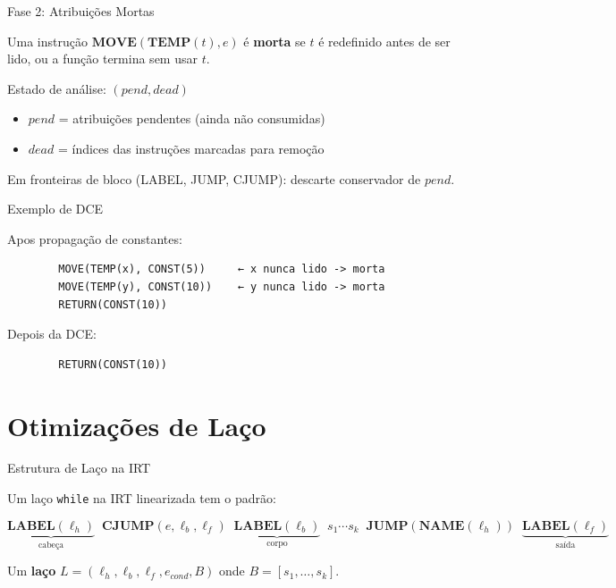 \begin{frame}{Fase 2: Atribuições Mortas}

    Uma instrução \(\mathbf{MOVE}(\mathbf{TEMP}(t), e)\) é \textbf{morta} se
    \(t\) é redefinido antes de ser lido, ou a função termina sem usar
    \(t\).

    Estado de análise: \((\mathit{pend}, \mathit{dead})\)

    \begin{itemize}

        \item
        \(\mathit{pend}\) = atribuições pendentes (ainda não consumidas)
        \item
        \(\mathit{dead}\) = índices das instruções marcadas para remoção
    \end{itemize}

    Em fronteiras de bloco (LABEL, JUMP, CJUMP): descarte conservador de
    \(\mathit{pend}\).
\end{frame}

\begin{frame}[fragile]{Exemplo de DCE}

    Apos propagação de constantes:

    \begin{lstlisting}
        MOVE(TEMP(x), CONST(5))     ← x nunca lido -> morta
        MOVE(TEMP(y), CONST(10))    ← y nunca lido -> morta
        RETURN(CONST(10))
    \end{lstlisting}

    Depois da DCE:

    \begin{lstlisting}
        RETURN(CONST(10))
    \end{lstlisting}
\end{frame}


\section{Otimizações de Laço}\label{otimizauxe7uxf5es-de-lauxe7o}

\begin{frame}[fragile]{Estrutura de Laço na IRT}

    Um laço \texttt{while} na IRT linearizada tem o padrão:

    \[\underbrace{\mathbf{LABEL}(\ell_h)}_{\text{cabeça}} \;\; \mathbf{CJUMP}(e, \ell_b, \ell_f) \;\; \underbrace{\mathbf{LABEL}(\ell_b)}_{\text{corpo}} \;\; s_1 \cdots s_k \;\; \mathbf{JUMP}(\mathbf{NAME}(\ell_h)) \;\; \underbrace{\mathbf{LABEL}(\ell_f)}_{\text{saída}}\]

    Um \textbf{laço} \(L = (\ell_h, \ell_b, \ell_f, e_\mathit{cond}, B)\)
    onde \(B = [s_1, \ldots, s_k]\).
\end{frame}

